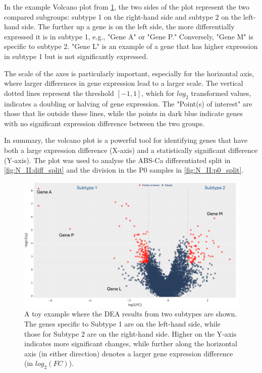 In the example Volcano plot from \cref{fig:lit:dea_eg}, the two sides of the plot represent the two compared subgroups: subtype 1 on the right-hand side and subtype 2 on the left-hand side. The further up a gene is on the left side, the more differentially expressed it is in subtype 1, e.g., "Gene A" or "Gene P." Conversely, "Gene M" is specific to subtype 2. "Gene L" is an example of a gene that has higher expression in subtype 1 but is not significantly expressed.

The scale of the axes is particularly important, especially for the horizontal axis, where larger differences in gene expression lead to a larger scale. The vertical dotted lines represent the threshold $[-1, 1]$, which for $log_{2}$ transformed values, indicates a doubling or halving of gene expression. The "Point(s) of interest" are those that lie outside these lines, while the points in dark blue indicate genes with no significant expression difference between the two groups.

In summary, the volcano plot is a powerful tool for identifying genes that have both a large expression difference (X-axis) and a statistically significant difference (Y-axis). The plot was used to analyse the ABS-Ca differentiated split in \cref{fig:N_II:diff_split} and the division in the P0 samples in \cref{fig:N_II:p0_split}.

\begin{figure}[H] 
    \centering
    \includegraphics[width=1.0\textwidth,height=1.0\textheight,keepaspectratio]{Sections/Lit_review/Resources/volcano_explainer.png}
    \caption[Example - Volcano plot]{A toy example where the DEA results from two subtypes are shown. The genes specific to Subtype 1 are on the left-hand side, while those for Subtype 2 are on the right-hand side. Higher on the Y-axis indicates more significant changes, while further along the horizontal axis (in either direction) denotes a larger gene expression difference (in $log_2(FC)$).}
    \label{fig:lit:dea_eg}
\end{figure}


